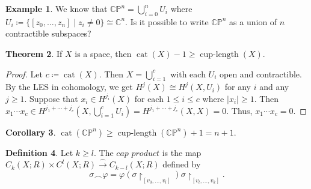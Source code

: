 \documentclass[10pt,letterpaper,cm]{nupset}
\theoremstyle{definition}
\newtheorem{definition}{Definition}[subsection]
\newtheorem{exmp}[definition]{Example}
\theoremstyle{theorem}
\newtheorem{theorem}[definition]{Theorem}
\newtheorem{corollary}[definition]{Corollary}
\theoremstyle{remark}
\newcommand{\C}{\mathbb C}
\newcommand{\CP}{\mathbb{CP}}
\newcommand{\1}{\mathbb{1}}
\newcommand{\0}{\vec 0}
\DeclareMathOperator{\clength}{cup{-}length}
\DeclareMathOperator{\cat}{cat}
\begin{document}
\begin{exmp}
We know that $\CP^n = \bigcup_{i=0}^n U_i$ where $U_i \coloneqq  \{[z_0, \ldots, z_n] \mid z_i \ne 0\} \cong \C^n$. Is it possible to write $\CP^n$ as a union of $n$ contractible subspaces?
\end{exmp}

\begin{theorem}
If $X$ is a space, then $\cat(X) -1 \geq \clength(X)$.
\end{theorem}
\begin{proof}
Let $c \coloneqq  \cat(X)$. Then $X = \bigcup_{i=1}^c$ with each $U_i$ open and contractible. By the LES in cohomology, we get $H^j(X) \cong H^j(X, U_i)$ for any $i$ and any $j\geq 1$. Suppose that $x_i \in H^{j_i}(X)$ for each $1\leq i \leq c$ where $\left\lvert{x_i}\right\rvert \geq 1$. Then $x_1 \cdots x_c \in H^{j_1 + \cdots + j_c}(X, \bigcup_{i=1}^c U_i) = H^{j_1 + \cdots + j_c}(X, X)= 0$. Thus, $x_1 \cdots x_c =0$. 
\end{proof}

\begin{corollary}
$\cat(\CP^n) \geq \clength(\CP^n) +1 = n+1$.
\end{corollary}

\begin{definition}
Let $k\geq l$. The $\textit{cap product}$ is the map $C_k(X; R) \times C^l(X; R) \overset{\frown}{\longrightarrow} C_{k-l}(X; R)$ defined by $$ \sigma \frown  \varphi =  \varphi(\sigma \restriction_{[v_0, \ldots, v_l]})\sigma\restriction_{[v_l, \ldots, v_k]}.$$
\end{definition}
\end{document}
